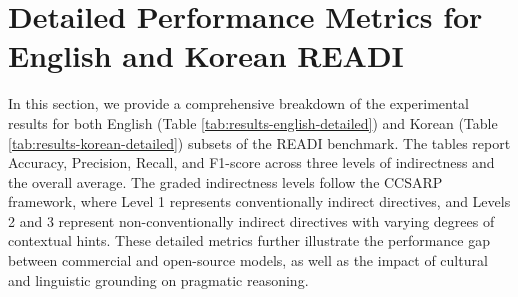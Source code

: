 \documentclass[11pt]{article}
\begin{document}
\vspace{-6pt}
\label{tab:example-ko}

\vspace{4pt}

\clearpage
\section{Detailed Performance Metrics for English and Korean READI}
\label{sec:appendix-detailed-results}
In this section, we provide a comprehensive breakdown of the experimental results for both English (Table \ref{tab:results-english-detailed}) and Korean (Table \ref{tab:results-korean-detailed}) subsets of the READI benchmark. The tables report Accuracy, Precision, Recall, and F1-score across three levels of indirectness and the overall average. 
The graded indirectness levels follow the CCSARP framework, where Level 1 represents conventionally indirect directives, and Levels 2 and 3 represent non-conventionally indirect directives with varying degrees of contextual hints. These detailed metrics further illustrate the performance gap between commercial and open-source models, as well as the impact of cultural and linguistic grounding on pragmatic reasoning.
\end{document}
